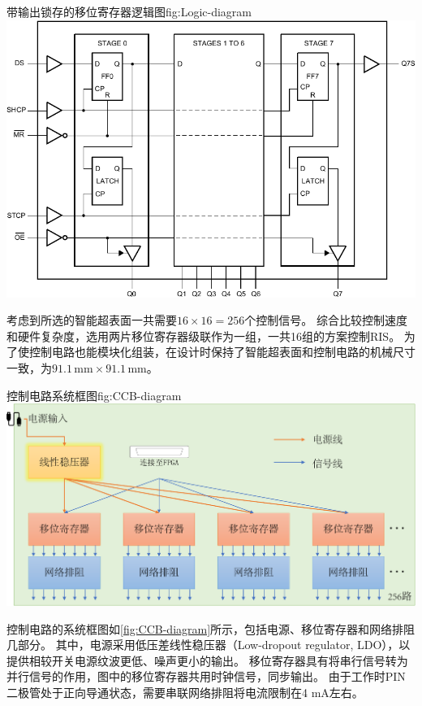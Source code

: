 \documentclass[supercite]{HustGraduPaper}
\begin{document}
\begin{generalfig}[htb]{带输出锁存的移位寄存器逻辑图}{fig:Logic-diagram}
	\includegraphics[width=0.8\linewidth]{Figures/Logic-diagram.pdf}
\end{generalfig}


考虑到所选的智能超表面一共需要$16\times16=256$个控制信号。
综合比较控制速度和硬件复杂度，选用两片移位寄存器级联作为一组，一共16组的方案控制RIS。
为了使控制电路也能模块化组装，在设计时保持了智能超表面和控制电路的机械尺寸一致，为$91.1 \, \mathrm{mm} \times 91.1 \, \mathrm{mm}$。

\begin{generalfig}[htb]{控制电路系统框图}{fig:CCB-diagram}
	\includegraphics[width=0.8\linewidth]{Figures/CCB-diagram.pdf}
\end{generalfig}

控制电路的系统框图如\autoref{fig:CCB-diagram}所示，包括电源、移位寄存器和网络排阻几部分。
其中，电源采用低压差线性稳压器（Low-dropout regulator, LDO），以提供相较开关电源纹波更低、噪声更小的输出。
移位寄存器具有将串行信号转为并行信号的作用，图中的移位寄存器共用时钟信号，同步输出。
由于工作时PIN二极管处于正向导通状态，需要串联网络排阻将电流限制在4 mA左右。

\end{document}
